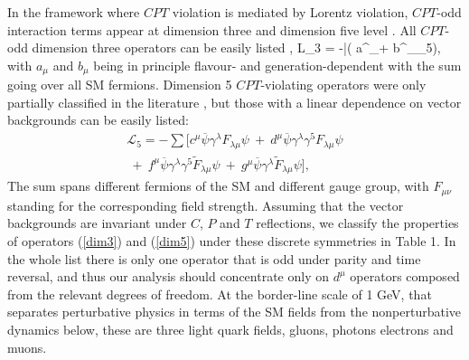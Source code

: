 \documentclass[prl,twocolumn,tightenlines,preprintnumbers,floatfix,nofootinbib]{revtex4}
\def\ba{\begin{eqnarray}}
\def\ea{\end{eqnarray}}
\begin{document}
In the framework where $CPT$ violation is mediated by Lorentz violation, 
$CPT$-odd interaction terms appear at dimension three \cite{Kost} and dimension
five level \cite{MP,BGNP}. All $CPT$-odd dimension three operators can be easily 
listed \cite{Kost}, 
\be
{\cal L}_3 = -\sum \bar \psi( a^\mu \gamma_\mu + b^\mu \gamma_\mu \gamma_5)\psi,
\label{dim3}
\ee
with $a_\mu$ and $b_\mu$ being in principle flavour- and generation-dependent 
with the sum going over all SM fermions. 
Dimension 5 $CPT$-violating operators
were only partially classified in the literature \cite{MP,BGNP}, but those with a linear 
dependence on  vector backgrounds can be easily listed:
\ba
\mathcal{L}_{ 5} =  -\sum [\nonumber
	c^\mu \overline{\psi} \gamma^\lambda F_{\lambda\mu} \psi
	~+~
	d^\mu \overline{\psi} \gamma^\lambda \gamma^5 F_{\lambda\mu} \psi
	\\~+~
{f}^\mu \overline{\psi} \gamma^\lambda \gamma^5
	\widetilde{F}_{\lambda\mu} \psi
	~+~
{g}^\mu  \overline{\psi} \gamma^\lambda 
	\widetilde{F}_{\lambda\mu}  \psi],
	\label{dim5}
\ea
The sum spans different fermions of the SM and different gauge group, 
with $F_{\mu\nu}$ standing for the corresponding field strength. 
Assuming that the vector backgrounds are invariant under $C$, $P$ and $T$ reflections, 
we classify the properties of operators (\ref{dim3}) and (\ref{dim5}) under these 
discrete symmetries in Table 1. In the whole list there is only one operator 
that is odd under parity and time reversal, and thus our analysis should concentrate 
only on $d^\mu$ operators composed from the relevant degrees of freedom. At the border-line 
scale of 1 GeV, that separates perturbative physics in terms of the SM fields 
from the nonperturbative dynamics below, these are three light quark fields, gluons,  photons
electrons and muons.
\end{document}
